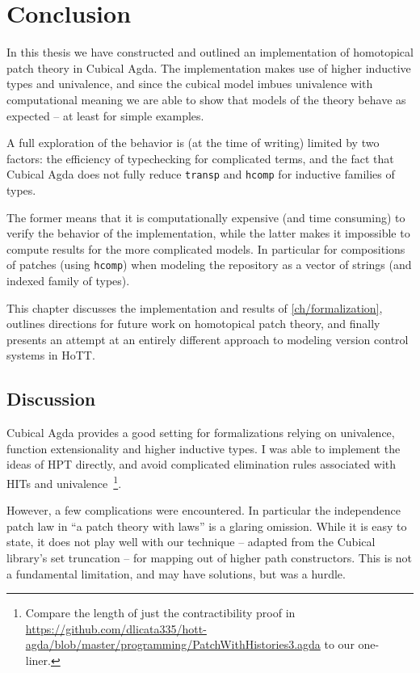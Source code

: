 \chapter{Conclusion}\label{ch/conclusion}

In this thesis we have constructed and outlined an implementation of homotopical
patch theory in Cubical Agda. The implementation makes use of higher inductive
types and univalence, and since the cubical model imbues univalence with
computational meaning we are able to show that models of the theory behave as
expected -- at least for simple examples.

A full exploration of the behavior is (at the time of writing) limited by two
factors: the efficiency of typechecking for complicated terms, and the fact that
Cubical Agda does not fully reduce \texttt{transp} and \texttt{hcomp} for
inductive families of types.

The former means that it is computationally expensive (and time consuming) to
verify the behavior of the implementation, while the latter makes it impossible
to compute results for the more complicated models. In particular for
compositions of patches (using \texttt{hcomp}) when modeling the repository as a
vector of strings (and indexed family of types).

This chapter discusses the implementation and results of
\autoref{ch/formalization}, outlines directions for future work on homotopical
patch theory, and finally presents an attempt at an entirely different approach to modeling
version control systems in HoTT.

\section{Discussion}
Cubical Agda provides a good setting for formalizations relying on univalence,
function extensionality and higher inductive types. I was able to implement the
ideas of HPT directly, and avoid complicated elimination rules associated with
HITs and univalence~\footnote{Compare the length of just the contractibility
proof in \url{https://github.com/dlicata335/hott-agda/blob/master/programming/PatchWithHistories3.agda}
to our one-liner.}.

However, a few complications were encountered. In particular the independence
patch law in ``a patch theory with laws'' is a glaring omission. While it is
easy to state, it does not play well with our technique -- adapted from the Cubical library's set
truncation -- for mapping out of higher path constructors. This is not a
fundamental limitation, and may have solutions, but was a hurdle.

